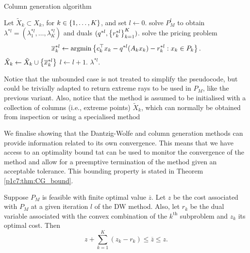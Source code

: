 \begin{algorithm}[h]
    \caption{Column generation algorithm} \label{p1c7:alg:CG}
    \begin{algorithmic}[1] %
    Let $\tilde{X}_k \subset X_k$, for $k \in \left\{ 1,\dots,K \right \}$, and set
    $l \gets 0$. 
    	\Repeat \label{Alg2:loop}
        \State solve $P_M^l$ to obtain $\lambda^{*l} = (\lambda_1^{*l},\dots, \lambda_K^{*l})$ and duals $(q^{*l}, \left\{ r_k^{*l} \right \}_{k=1}^K)$.
            \State solve the pricing problem
            $$\overline{x}^{*l}_k \gets \mathop{\rm argmin} \left\{ c_k^\top x_k - q^{*l}(A_kx_k) - r^{*l}_k : x_k \in P_k \right \}.
            $$
             $\tilde{X}_k \gets \tilde{X}_k \cup \left\{ \overline{x}^{*l}_k \right \}$ \label{p1c7:alg:CGcolgen}
            \EndIf  
        \EndFor
        \State $l \gets l + 1$.
     $\lambda^{*l}$.
    \end{algorithmic}
\end{algorithm}

Notice that the unbounded case is not treated to simplify the pseudocode, but could be trivially adapted to return extreme rays to be used in $P_M$, like the previous variant. Also, notice that the method is assumed to be initialised with a collection of columns (i.e., extreme points) $\tilde{X}_k$, which can normally be obtained from inspection or using a specialised method

We finalise showing that the Dantzig-Wolfe and column generation methods can provide information related to its own convergence. This means that we have access to an optimality bound tat can be used to monitor the convergence of the method and allow for a preemptive termination of the method given an acceptable tolerance. This bounding property is stated in Theorem \ref{p1c7:thm:CG_bound}.

\begin{theorem} \label{p1c7:thm:CG_bound}
	Suppose $P_M$ is feasible with finite optimal value $\overline{z}$. Let $z$ be the cost associated with $P_M$ at a given iteration $l$ of the DW method. Also, let $r_k$ be the dual variable associated with the convex combination of the $k^\text{th}$ subproblem and $z_k$ its optimal cost. Then
		\begin{equation*}
			z + \sum_{k=1}^K (z_k - r_k) \leq \overline{z} \leq z.	
		\end{equation*}
\end{theorem}

